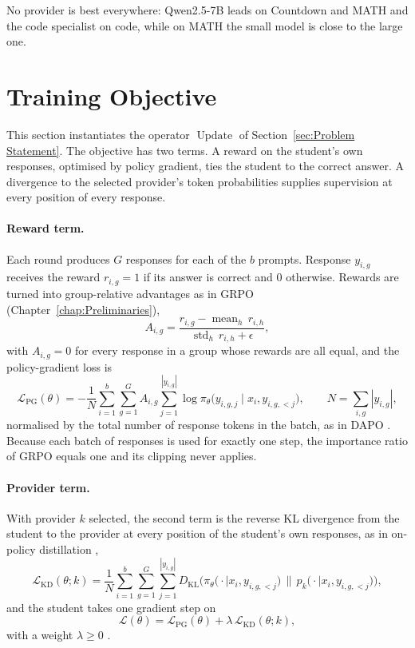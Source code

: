 No provider is best everywhere: Qwen2.5-7B leads on Countdown and MATH and the code
specialist on code, while on MATH the small model is close to the large one.

\section{Training Objective}
\label{imp:sec:update}

This section instantiates the operator $\operatorname{Update}$ of
Section~\ref{sec:Problem Statement}. The objective has two terms. A reward on the
student's own responses, optimised by policy gradient, ties the student to the correct
answer. A divergence to the selected provider's token probabilities supplies supervision
at every position of every response.

\paragraph{Reward term.} Each round produces $G$ responses for each of the $b$ prompts.
Response $y_{i,g}$ receives the reward $r_{i,g} = 1$ if its answer is correct and 0
otherwise. Rewards are turned into group-relative advantages as in GRPO
(Chapter~\ref{chap:Preliminaries}),
\[
  A_{i,g} = \frac{r_{i,g} - \operatorname{mean}_{h}\, r_{i,h}}{\operatorname{std}_{h}\, r_{i,h} + \epsilon},
\]
with $A_{i,g} = 0$ for every response in a group whose rewards are all equal, and the
policy-gradient loss is
\begin{equation}
  \mathcal{L}_{\mathrm{PG}}(\theta) = -\frac{1}{N}
    \sum_{i=1}^{b} \sum_{g=1}^{G} A_{i,g} \sum_{j=1}^{|y_{i,g}|}
    \log \pi_\theta\big(y_{i,g,j} \mid x_i, y_{i,g,<j}\big),
    \qquad N = \sum_{i,g} |y_{i,g}|,
  \label{imp:eq:loss}
\end{equation}
normalised by the total number of response tokens in the batch, as in DAPO
\autocite{yu_dapo_2025}. Because each batch of responses is used for exactly one step,
the importance ratio of GRPO equals one and its clipping never applies.

\paragraph{Provider term.} With provider $k$ selected, the second term is the reverse
KL divergence from the student to the provider at every position of the student's own
responses, as in on-policy distillation \autocite{agarwal_gkd_2024,gu_minillm_2024},
\begin{equation}
  \mathcal{L}_{\mathrm{KD}}(\theta; k) = \frac{1}{N}
    \sum_{i=1}^{b} \sum_{g=1}^{G} \sum_{j=1}^{|y_{i,g}|}
    D_{\mathrm{KL}}\Big( \pi_\theta\big(\cdot \mid x_i, y_{i,g,<j}\big) \,\Big\|\,
                         p_k\big(\cdot \mid x_i, y_{i,g,<j}\big) \Big),
  \label{imp:eq:kd}
\end{equation}
and the student takes one gradient step on
\begin{equation}
  \mathcal{L}(\theta) = \mathcal{L}_{\mathrm{PG}}(\theta)
    + \lambda\, \mathcal{L}_{\mathrm{KD}}(\theta; k),
  \label{imp:eq:total}
\end{equation}
with a weight $\lambda \ge 0$ .

